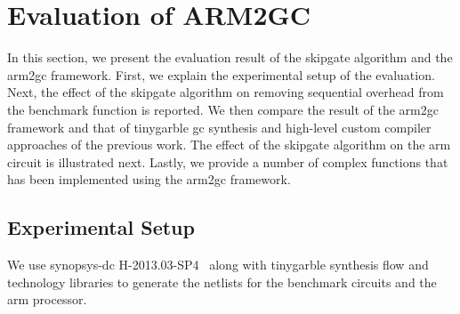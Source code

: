 
\section{Evaluation of ARM2GC}\label{sec:eval-arm2gc}
In this section, we present the evaluation result of the \gls{skipgate} algorithm and the \gls{arm2gc} framework.
First, we explain the experimental setup of the evaluation.
Next, the effect of the \gls{skipgate} algorithm on removing sequential overhead from the benchmark function is reported.
We then compare the result of the \gls{arm2gc} framework and that of \gls{tinygarble} \acrshort{gc} synthesis and high-level custom compiler approaches of the previous work.
The effect of the \gls{skipgate} algorithm on the \gls{arm} circuit is illustrated next.
Lastly, we provide a number of complex functions that has been implemented using the \gls{arm2gc} framework.

\subsection{Experimental Setup}
We use \gls{synopsys-dc} H-2013.03-SP4~\cite{tool:DesignCompiler} along with \gls{tinygarble} synthesis flow and technology libraries to generate the \gls{netlist}s for the benchmark circuits and the \gls{arm} processor.

